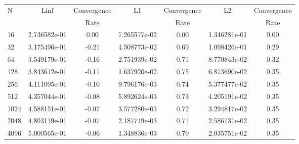 \documentclass[12pt]{article}
\begin{document}
	\begin{tabular}{l|c|c|c|c|c|c}
		N&Linf&Convergence&L1&Convergence&L2&Convergence\\
		&&Rate&&Rate&&Rate\\
		\hline
		16&2.736582e-01&0.00&7.265577e-02&0.00&1.346281e-01&0.00\\
		\hline
		32&3.175496e-01&-0.21&4.508773e-02&0.69&1.098426e-01&0.29\\
		\hline
		64&3.549179e-01&-0.16&2.751939e-02&0.71&8.770843e-02&0.32\\
		\hline
		128&3.843612e-01&-0.11&1.637920e-02&0.75&6.873690e-02&0.35\\
		\hline
		256&4.111095e-01&-0.10&9.796176e-03&0.74&5.377477e-02&0.35\\
		\hline
		512&4.357044e-01&-0.08&5.892624e-03&0.73&4.205191e-02&0.35\\
		\hline
		1024&4.588151e-01&-0.07&3.577280e-03&0.72&3.294817e-02&0.35\\
		\hline
		2048&4.803119e-01&-0.07&2.187719e-03&0.71&2.586131e-02&0.35\\
		\hline
		4096&5.000565e-01&-0.06&1.348836e-03&0.70&2.035751e-02&0.35\\
	\end{tabular}
\end{document}
